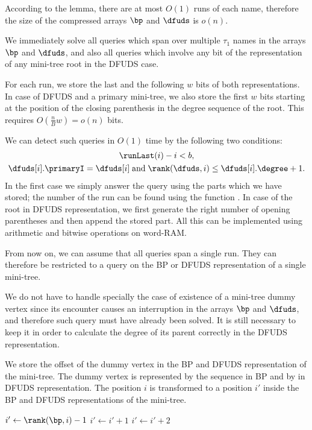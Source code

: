 According to the lemma, there are at most $O(1)$ runs of each name, therefore the size of the compressed arrays $\bp$ and $\dfuds$ is $o(n)$.

\bigbreak

We immediately solve all queries which span over multiple $\tau_1$ names in the arrays $\bp$ and $\dfuds$, and also all queries which involve any bit of the representation of any mini-tree root in the DFUDS case.

For each run, we store the last and the following $w$ bits of both representations.
In case of DFUDS and a primary mini-tree, we also store the first $w$ bits starting at the position of the closing parenthesis in the degree sequence of the root.
This requires $O(\frac{n}{B} w) = o(n)$ bits.

We can detect such queries in $O(1)$ time by the following two conditions:
\begin{gather*}
	\runLast(i) - i < b, \\
	\dfuds[i].\primaryI = \dfuds[i] \booland \rank(\dfuds, i) \le \dfuds[i].\degree + 1.
\end{gather*}
In the first case we simply answer the query using the parts which we have stored; the number of the run can be found using the function \elementIndex{}.
In case of the root in DFUDS representation, we first generate the right number of opening parentheses and then append the stored part.
All this can be implemented using arithmetic and bitwise operations on word-RAM.

From now on, we can assume that all queries span a single run.
They can therefore be restricted to a query on the BP or DFUDS representation of a single mini-tree.

We do not have to handle specially the case of existence of a mini-tree dummy vertex since its encounter causes an interruption in the arrays $\bp$ and $\dfuds$, and therefore such query must have already been solved.
It is still necessary to keep it in order to calculate the degree of its parent correctly in the DFUDS representation.

We store the offset of the dummy vertex in the BP and DFUDS representation of the mini-tree.
The dummy vertex is represented by the sequence \str{()} in BP and by \str{)} in DFUDS representation.
The position $i$ is transformed to a position $i'$ inside the BP and DFUDS representations of the mini-tree.

\begin{algorithm}
\begin{algorithmic}
	\State $i' \gets \rank(\bp, i) - 1$
	 
		\State $i' \gets i' + 1$ 
	\EndIf
	 
		\State $i' \gets i' + 2$ 
	\EndIf
\EndFunction
\end{algorithmic}
\end{algorithm}

